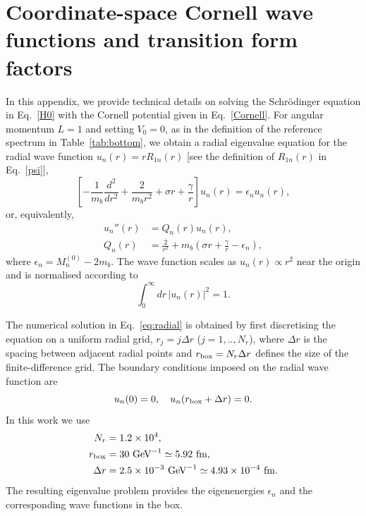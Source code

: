 \documentclass[aps,prd,showpacs,amsmath,twocolumn,superscriptaddress,floatfix,nofootinbib,notitlepage]{revtex4-2}
\newcommand{\be}{\begin{equation}}
\newcommand{\ee}{\end{equation}}
\begin{document}
\appendix

\section{Coordinate-space Cornell wave functions and transition form factors}
\label{app:cornell}

In this appendix, we provide technical details on solving the Schr{\"o}dinger equation in Eq.~\eqref{H0} with the Cornell potential given in Eq.~\eqref{Cornell}. For angular momentum $L=1$ and setting $V_0=0$, as in the definition of the reference spectrum in Table~\ref{tab:bottom}, we obtain a radial eigenvalue equation for the radial wave function $u_n(r)=rR_{1n}(r)$ [see the definition of $R_{1n}(r)$ in Eq.~\eqref{psi}],
\be
\left[-\frac{1}{m_b}\frac{d^2}{dr^2}
+\frac{2}{m_b r^2}+\sigma r+\frac{\gamma}{r}\right]u_n(r)
=\epsilon_n u_n(r),
\label{eq:radial}
\ee
or, equivalently,
\be
\begin{split}
u_n''(r)&=Q_n(r)u_n(r),\\
Q_n(r)&=\frac{2}{r^2}
+m_b\left(\sigma r+\frac{\gamma}{r}-\epsilon_n\right),
\end{split}
\label{eq:radialQ}
\ee
where $\epsilon_n=M_n^{(0)}-2m_b$. The wave function scales as $u_n(r)\propto r^2$ near the origin and is normalised according to
\be
\int_0^\infty dr\,|u_n(r)|^2=1.
\label{unorm}
\ee

The numerical solution in Eq.~\eqref{eq:radial} is obtained by first discretising the equation on a uniform radial grid, $r_j=j\Delta r$ ($j=1,..,N_r$), where $\Delta r$ is the spacing between adjacent radial points and $r_{\rm box}=N_r\Delta r$ defines the size of the finite-difference grid. The boundary conditions imposed on the radial wave function are 
\be
u_n(0)=0,\quad u_n(r_{\rm box}+\Delta r)=0.
\ee
In this work we use
\be
\begin{split}
N_r&=1.2\times10^4,\\
r_{\rm box}&=30~{\rm GeV}^{-1}\simeq5.92~{\rm fm},\\
\Delta r&=2.5\times10^{-3}~{\rm GeV}^{-1}
\simeq4.93\times10^{-4}~{\rm fm}.
\end{split}
\ee
The resulting eigenvalue problem provides the eigenenergies $\epsilon_n$ and the corresponding wave functions in the box.
\end{document}
